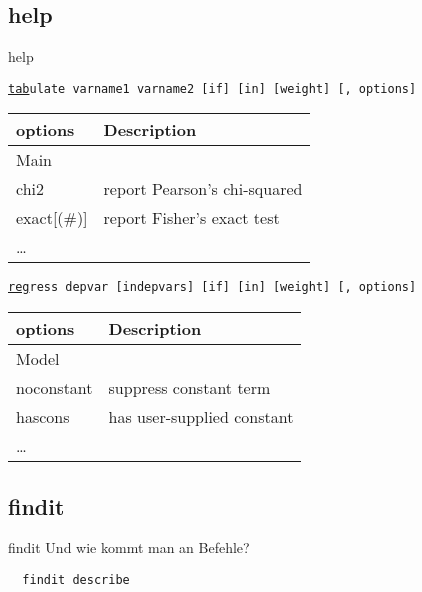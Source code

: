 \subsection{help}
\begin{frame}{help} 
\begin{scriptsize}
  \texttt{\underline{tab}ulate \textcolor{Statakeywords}{varname1} \textcolor{Statakeywords}{varname2} [\textcolor{Statakeywords}{if}] [\textcolor{Statakeywords}{in}] [\textcolor{Statakeywords}{weight}] [, options]} \\ \vspace{.5cm}

  \begin{tabular}{ll}
  options & Description \\
  \midrule
  Main & \\
  chi2 &               report Pearson's chi-squared \\
  exact[(\#)] &         report Fisher's exact test \\
  \dots & \\
  \end{tabular} \vspace{.5cm}

  \texttt{\underline{reg}ress \textcolor{Statakeywords}{depvar} [\textcolor{Statakeywords}{indepvars}] [\textcolor{Statakeywords}{if}] [\textcolor{Statakeywords}{in}] [\textcolor{Statakeywords}{weight}] [, options]} \\
  \vspace{.5cm}
  
  \begin{tabular}{ll}
  options & Description \\
  \midrule
  Model & \\
  noconstant & suppress constant term \\
  hascons & has user-supplied constant \\
  \dots & \\
  \end{tabular}

\end{scriptsize}
\end{frame}

\subsection{findit}
\begin{frame}[fragile]{findit} 
Und wie kommt man an Befehle?
\begin{lstlisting}
  findit describe
\end{lstlisting}


\end{frame}


